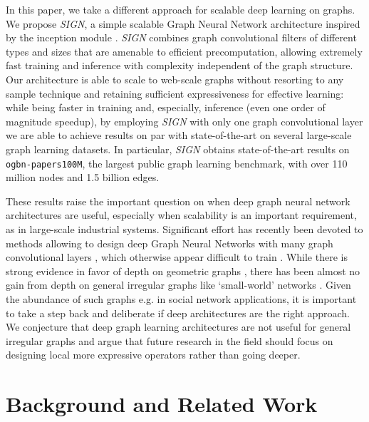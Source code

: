 \documentclass{article}
\begin{document}
In this paper, we take a different approach for scalable deep learning on graphs. We propose \textit{SIGN}, a simple scalable Graph Neural Network architecture inspired by the inception module  \cite{szegedy2015going, anees2019inception}. \textit{SIGN} combines graph convolutional filters of different types and sizes that are amenable to efficient precomputation, allowing extremely fast training and inference with complexity independent of the graph structure. Our architecture is able to scale to web-scale graphs without resorting to any sample technique and retaining sufficient expressiveness for effective learning: while being faster in training and, especially, inference (even one order of magnitude speedup), by employing \textit{SIGN} with only one graph convolutional layer we are able to achieve results on par with state-of-the-art on several large-scale graph learning datasets. In particular, \textit{SIGN} obtains state-of-the-art results on \texttt{ogbn-papers100M}, the largest public graph learning benchmark, with over 110 million nodes and 1.5 billion edges.


These results raise the important question on when deep graph neural network architectures are useful, especially when scalability is an important requirement, as in large-scale industrial systems. 
Significant effort has recently been devoted to methods allowing to design deep Graph Neural Networks with many graph convolutional layers \cite{jk,gong2020geometrically,li2019deepgcns,zhao2019pairnorm,rong2019dropedge}, which otherwise appear difficult to train \cite{li2018adaptive,klicpera2018predict,wu2020comprehensive}. 
While there is strong evidence in favor of depth on geometric graphs \cite{he2016deep,li2019deepgcns,gong2020geometrically}, there has been almost no gain from depth on general irregular graphs like `small-world' networks \cite{shchur2018pitfalls,rong2019dropedge}. 
Given the abundance of such graphs e.g. in social network applications, it is important to take a step back and deliberate if deep architectures are the right approach.
We conjecture that deep graph learning architectures are not useful for general irregular graphs and argue that future research in the field should focus on designing local more expressive operators \cite{barbarossa2019topological,monti2018motifnet,flam2020neural} rather than going deeper. 





\section{Background and Related Work} \label{sec:background}
\end{document}
